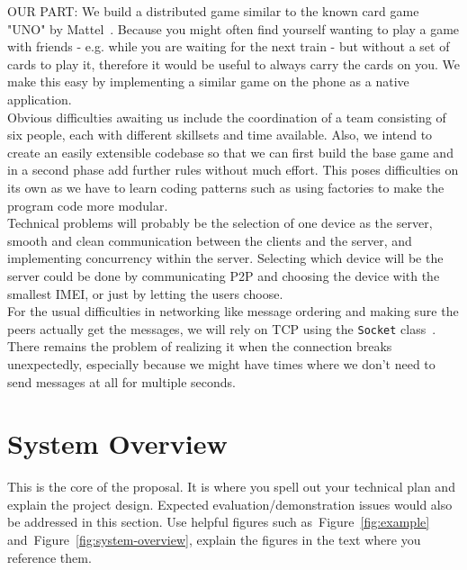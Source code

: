 \documentclass{report}
\newcommand{\rfig}[1]{Figure~\ref{fig:#1}}
\begin{document}
OUR PART:
We build a distributed game similar to the known card game "UNO" by Mattel~\cite{unoshop}. Because you might often find yourself wanting to play a game with friends - e.g. while you are waiting for the next train - but without a set of cards to play it, therefore it would be useful to always carry the cards on you. We make this easy by implementing a similar game on the phone as a native application.\\

Obvious difficulties awaiting us include the coordination of a team consisting of six people, each with different skillsets and time available.
Also, we intend to create an easily extensible codebase so that we can first build the base game and in a second phase add further rules without much effort. This poses difficulties on its own as we have to learn coding patterns such as using factories to make the program code more modular.\\
Technical problems will probably be the selection of one device as the server, smooth and clean communication between the clients and the server, and implementing concurrency within the server. Selecting which device will be the server could be done by communicating P2P and choosing the device with the smallest IMEI, or just by letting the users choose.\\

For the usual difficulties in networking like message ordering and making sure the peers actually get the messages, we will rely on TCP using the \verb|Socket| class~\cite{socketdoc}. There remains the problem of realizing it when the connection breaks unexpectedly, especially because we might have times where we don't need to send messages at all for multiple seconds.


\section{System Overview}

This is the core of the proposal.
It is where you spell out your technical plan and explain the project design.
Expected evaluation/demonstration issues would also be addressed in this section.
Use helpful figures such as~\rfig{example} and~\rfig{system-overview},
explain the figures in the text where you reference them. 
\end{document}
